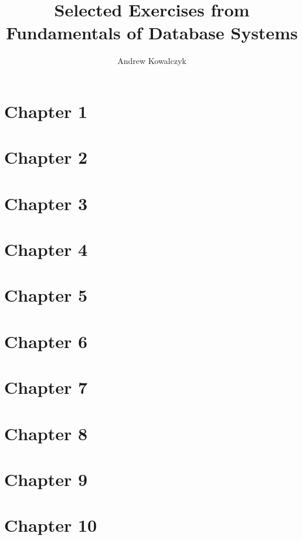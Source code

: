 \documentclass[11pt, oneside]{article}   	%
\title{Selected Exercises from Fundamentals of Database Systems}
\author{Andrew Kowalczyk}
\begin{document}
\maketitle
\section{Chapter 1}
\section{Chapter 2}
\section{Chapter 3}
\section{Chapter 4}
\section{Chapter 5}
\section{Chapter 6}
\section{Chapter 7}
\section{Chapter 8}
\section{Chapter 9}
\section{Chapter 10}
\end{document}

